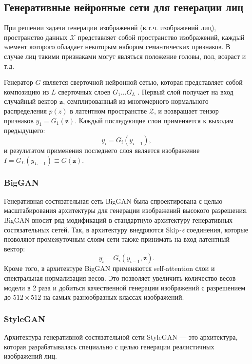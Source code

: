 \subsection{Генеративные нейронные сети для генерации лиц}

При решении задачи генерации изображений (в.т.ч. изображений лиц), пространство данных $\mathcal X$ представляет собой пространство изображений, каждый элемент которого обладает некоторым набором семантических признаков.
В случае лиц такими признаками могут являться положение головы, пол, возраст и т.д.

Генератор $G$ является сверточной нейронной сетью, которая представляет собой композицию из $L$ сверточных слоев $G_1 ... G_L$ . 
Первый слой получает на вход случайный вектор $\mathbf z$, семплированный из многомерного нормального распределения $p(z)$ в латентном пространстве $\mathcal Z$, и возвращает тензор признаков $y_1 = G_1(\mathbf z)$. 
Каждый последующие слои применяется к выходам предыдущего: 
$$ y_i = G_i(y_{i-1}), $$
и результатом применения последнего слоя является изображение $I = G_L(y_{L-1}) \equiv G(\mathbf z)$.

\subsubsection{BigGAN}

Генеративная состязательная сеть BigGAN \cite{bigGAN} была спроектирована с целью масштабирования архитектуры для генерации изображений высокого разрешения.
BigGAN вносит ряд модификаций в стандартную архитектуру генеративных состязательных сетей.
Так, в архитектуру внедряются Skip\emph{-z} соединения, которые позволяют промежуточным слоям сети также принимать на вход латентный вектор:
$$ y_i = G_i(y_{i-1}, \mathbf z). $$
Кроме того, в архитектуре BigGAN применяются self-attention слои и спектральная нормализация весов.
Это позволяет увеличить количество весов модели в 2 раза и добиться качественной генерации изображений с разрешением до $512\times512$ на самых разнообразных классах изображений.

\subsubsection{StyleGAN}
Архитектура генеративной состязательной сети StyleGAN \cite{StyleGAN} --– это архитектура, которая разрабатывалась специально с целью генерации реалистичных изображений лиц.

